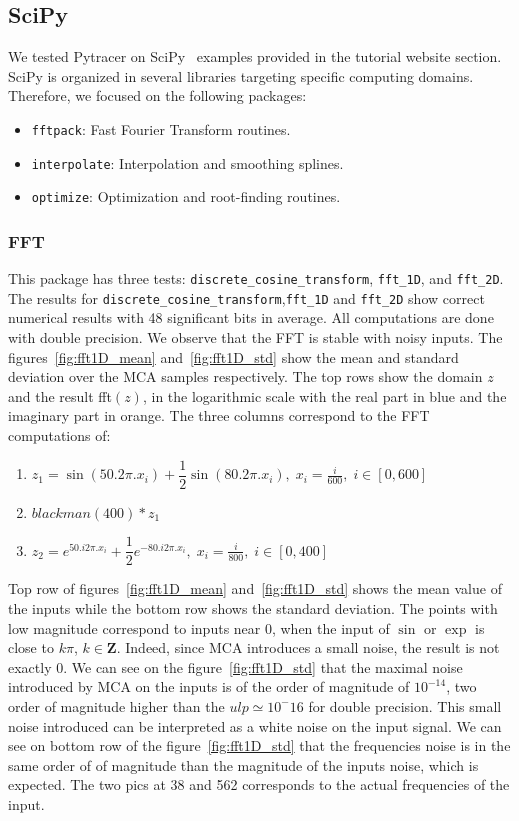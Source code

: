 \documentclass[11pt]{article}
\begin{document}
\subsection{SciPy}
\label{sec:scipy_tests}

We tested Pytracer on SciPy~\cite{virtanen2020scipy} examples provided in the tutorial website section.
SciPy is organized in several libraries targeting specific computing domains.
Therefore, we focused on the following packages:
\begin{itemize}
    \item \texttt{fftpack}: Fast Fourier Transform routines.
    \item \texttt{interpolate}: Interpolation and smoothing splines.
    \item \texttt{optimize}: Optimization and root-finding routines.
\end{itemize}

\subsubsection{FFT}

This package has three tests: \texttt{discrete\_cosine\_transform}, \texttt{fft\_1D}, and \texttt{fft\_2D}.
The results for \texttt{discrete\_cosine\_transform},\texttt{fft\_1D} and  \texttt{fft\_2D} show
correct numerical results with 48 significant bits in average. All computations are done with double precision.
We observe that the FFT is stable with noisy inputs. The figures~\ref{fig:fft1D_mean} and~\ref{fig:fft1D_std}
show the mean and standard deviation over the MCA samples respectively. 
The top rows show the domain $z$ and the result fft$(z)$, in the logarithmic scale with the real part in blue and the imaginary part in orange.
The three columns correspond to the FFT computations of: 
\begin{enumerate}
\item $z_1 = \sin(50 . 2\pi . x_i) + \dfrac{1}{2} \sin(80 . 2\pi . x_i),\; x_i = \frac{i}{600},\; i \in [0,600]$
\item $ blackman(400)*z_1$
\item $ z_2= e^{50 . i 2\pi . x_i} + \dfrac{1}{2} e^{-80 . i2\pi .x_i },\; x_i = \frac{i}{800},\; i \in [0,400] $
\end{enumerate}

Top row of figures~\ref{fig:fft1D_mean} and~\ref{fig:fft1D_std} 
shows the mean value of the inputs while the bottom row shows the standard deviation.
The points with low magnitude correspond to inputs near 0, when the input of $\sin$ or 
$\exp$ is close to $k\pi$, $k \in \mathbf{Z}$.
Indeed, since MCA introduces a small noise, the result is not exactly 0.
We can see on the figure~\ref{fig:fft1D_std} that the maximal noise introduced by MCA on the
inputs is of the order of magnitude of $10^{-14}$, two order of magnitude higher than the 
$ulp \simeq 10^-16$ for double precision. 
This small noise introduced can be interpreted as a white noise on the input signal. 
We can see on bottom row of the figure~\ref{fig:fft1D_std} that the frequencies noise is in 
the same order of of magnitude than the magnitude of the inputs noise, which is expected. 
The two pics at 38 and 562 corresponds to the actual frequencies of the input.
\end{document}
